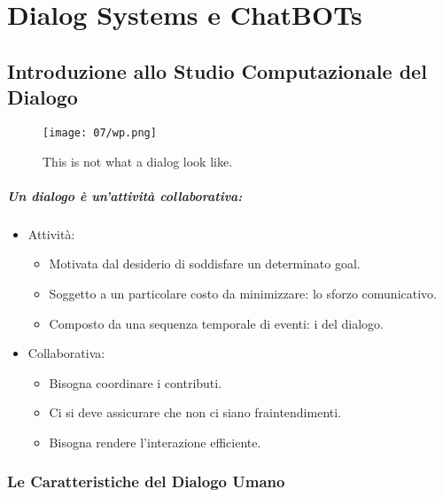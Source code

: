 \chapter{Dialog Systems e ChatBOTs}

\section{Introduzione allo Studio Computazionale del Dialogo}


\begin{figure}[h]
    \centering
    \texttt{[image: 07/wp.png]}
    \caption{This is not what a dialog look like.}
\end{figure}


\paragraph{Un dialogo è un'attività collaborativa:}

\begin{itemize}
  \item Attività: 
    \begin{itemize}
      \item Motivata dal desiderio di soddisfare un determinato goal. 
      \item Soggetto a un particolare costo da minimizzare: lo sforzo comunicativo. 
      \item Composto da una sequenza temporale di eventi: i  del dialogo.
    \end{itemize}
  \item Collaborativa: 
    \begin{itemize}
      \item Bisogna coordinare i contributi. 
      \item Ci si deve assicurare che non ci siano fraintendimenti. 
      \item Bisogna rendere l'interazione efficiente.
    \end{itemize}
\end{itemize}

\subsection{Le Caratteristiche del Dialogo Umano}


